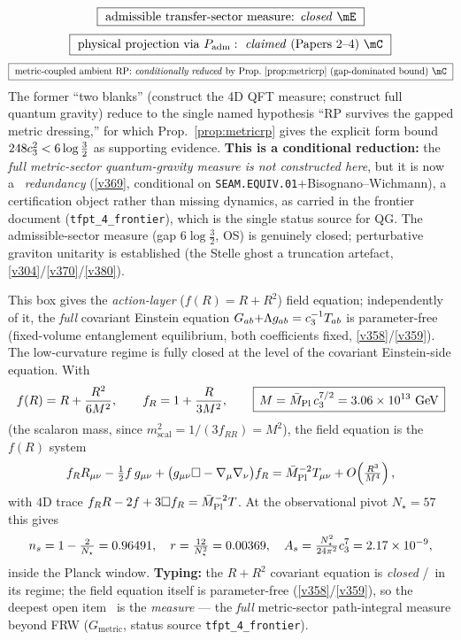 \begin{gapbox}
\[
  \boxed{\ \text{admissible transfer-sector measure: \emph{closed} \mE}\ }
\]
\[
  \boxed{\ \text{physical projection via }P_{\mathrm{adm}}:\ \text{\emph{claimed} (Papers 2--4) \mC}\ }
\]
\[
  \boxed{\ \text{metric-coupled ambient RP: \emph{conditionally reduced} by Prop.~\ref{prop:metricrp} (gap-dominated bound) \mC}\ }
\]
The former ``two blanks'' (construct the 4D QFT measure; construct full quantum gravity) reduce to the
single named hypothesis ``RP survives the gapped metric dressing,'' for which Prop.~\ref{prop:metricrp}
gives the explicit form bound $248c_3^2<6\log\tfrac32$ as supporting evidence. \textbf{This is a
conditional reduction:} the \emph{full metric-sector quantum-gravity measure is not constructed here}, but it is
now a \mC\ \emph{redundancy} (\vref{v369}, conditional on \texttt{SEAM.EQUIV.01}${+}$Bisognano--Wichmann), a
certification object rather than missing dynamics, as carried in the frontier document
(\texttt{tfpt\_4\_frontier}), which is the single status source for QG. The admissible-sector measure
(gap $6\log\tfrac32$, OS) is genuinely closed; perturbative graviton unitarity is established (the Stelle ghost a
truncation artefact, \vref{v304}/\vref{v370}/\vref{v380}).\end{gapbox}

\begin{keybox}
This box gives the \emph{action-layer} ($f(R)=R+R^2$) field equation; independently of it, the \emph{full}
covariant Einstein equation $G_{ab}{+}\Lambda g_{ab}=c_3^{-1}T_{ab}$ is parameter-free (fixed-volume
entanglement equilibrium, both coefficients fixed, \vref{v358}/\vref{v359}). The low-curvature regime is
fully closed at the level of the covariant Einstein-side equation. With
\[
  f(R)=R+\frac{R^2}{6M^2},\qquad f_R=1+\frac{R}{3M^2},\qquad
  \boxed{\,M=\Mbar\,\cthree^{7/2}=3.06\times10^{13}\ \mathrm{GeV}\,}
\]
(the scalaron mass, since $m_{\mathrm{scal}}^2=1/(3f_{RR})=M^2$), the field equation is the $f(R)$ system
\[
  f_R R_{\mu\nu}-\tfrac12 f\,g_{\mu\nu}+\bigl(g_{\mu\nu}\Box-\nabla_\mu\nabla_\nu\bigr)f_R
  =\bar M_{\mathrm{Pl}}^{-2}T_{\mu\nu}+O\!\left(\tfrac{R^3}{M^4}\right),
\]
with $4$D trace $f_R R-2f+3\Box f_R=\bar M_{\mathrm{Pl}}^{-2}T$. At the observational pivot $N_\star=57$ this gives
\[
  n_s=1-\tfrac2{N_\star}=0.96491,\quad r=\tfrac{12}{N_\star^2}=0.00369,\quad
  A_s=\tfrac{N_\star^2}{24\pi^2}c_3^7=2.17\times10^{-9},
\]
inside the Planck window. \textbf{Typing:} the $R+R^2$ covariant equation is \emph{closed} \mE/\mC\ in its
regime; the field equation itself is parameter-free (\vref{v358}/\vref{v359}), so the deepest open item \mO\
is the \emph{measure} --- the \emph{full} metric-sector path-integral measure beyond FRW
($G_{\mathrm{metric}}$, status source \texttt{tfpt\_4\_frontier}). 
\end{keybox}

